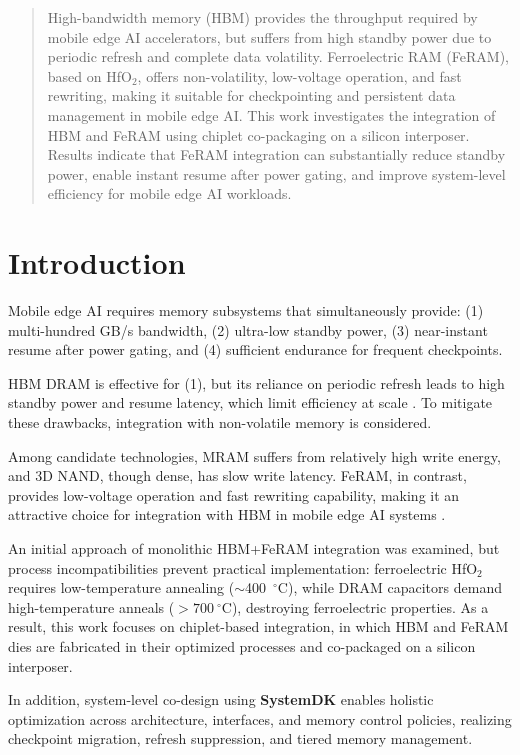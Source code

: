 \begin{abstract}
High-bandwidth memory (HBM) provides the throughput required by mobile edge AI accelerators, 
but suffers from high standby power due to periodic refresh and complete data volatility. 
Ferroelectric RAM (FeRAM), based on HfO$_2$, offers non-volatility, low-voltage operation, and fast rewriting, 
making it suitable for checkpointing and persistent data management in mobile edge AI. 
This work investigates the integration of HBM and FeRAM using chiplet co-packaging on a silicon interposer. 
Results indicate that FeRAM integration can substantially reduce standby power, enable instant resume after power gating, 
and improve system-level efficiency for mobile edge AI workloads.
\end{abstract}

\section{Introduction}
Mobile edge AI requires memory subsystems that simultaneously provide:
(1) multi-hundred GB/s bandwidth, 
(2) ultra-low standby power, 
(3) near-instant resume after power gating, and 
(4) sufficient endurance for frequent checkpoints.  

HBM DRAM is effective for (1), but its reliance on periodic refresh leads to high standby power and resume latency, 
which limit efficiency at scale \cite{ChoiIEDM2022,KimIEDM2021}.  
To mitigate these drawbacks, integration with non-volatile memory is considered.  

Among candidate technologies, MRAM suffers from relatively high write energy, 
and 3D NAND, though dense, has slow write latency.  
FeRAM, in contrast, provides low-voltage operation and fast rewriting capability, 
making it an attractive choice for integration with HBM in mobile edge AI systems \cite{MuellerIEDM2012,MartinVLSI2020,NohedaNature2023}.  

An initial approach of monolithic HBM+FeRAM integration was examined, 
but process incompatibilities prevent practical implementation:  
ferroelectric HfO$_2$ requires low-temperature annealing ($\sim$400~$^\circ$C), 
while DRAM capacitors demand high-temperature anneals ($>700~^\circ$C), 
destroying ferroelectric properties.  
As a result, this work focuses on chiplet-based integration, 
in which HBM and FeRAM dies are fabricated in their optimized processes and co-packaged on a silicon interposer.  

In addition, system-level co-design using \textbf{SystemDK} enables holistic optimization across architecture, interfaces, and memory control policies, 
realizing checkpoint migration, refresh suppression, and tiered memory management.  

